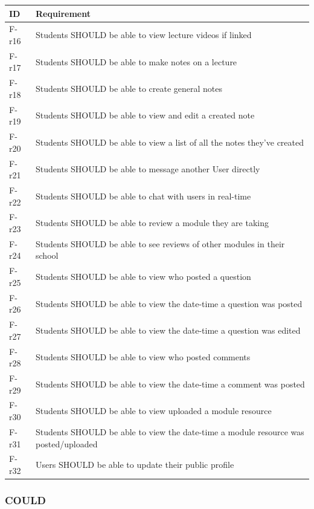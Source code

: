 \begin{tabular}{|p{1cm}|p{13cm}|}
    \hline
        \textbf{ID} & \textbf{Requirement} \\
    \hline
    F-r16 &
    Students SHOULD be able to view lecture videos if linked \\
    \hline
    F-r17 &
    Students SHOULD be able to make notes on a lecture \\
    \hline
    F-r18 &
    Students SHOULD be able to create general notes \\
    \hline
    F-r19 &
    Students SHOULD be able to view and edit a created note \\
    \hline
    F-r20 &
    Students SHOULD be able to view a list of all the notes they’ve created \\
    \hline
    F-r21 &
    Students SHOULD be able to message another User directly \\
    \hline
    F-r22 &
    Students SHOULD be able to chat with users in real-time \\
    \hline
    F-r23 &
    Students SHOULD be able to review a module they are taking \\
    \hline
    F-r24 &
    Students SHOULD be able to see reviews of other modules in their school \\
    \hline
    F-r25 &
    Students SHOULD be able to view who posted a question \\
    \hline
    F-r26 &
    Students SHOULD be able to view the date-time a question was posted \\
    \hline
    F-r27 &
    Students SHOULD be able to view the date-time a question was edited \\
    \hline
    F-r28 &
    Students SHOULD be able to view who posted comments \\
    \hline
    F-r29 &
    Students SHOULD be able to view the date-time a comment was posted \\
    \hline
    F-r30 &
    Students SHOULD be able to view uploaded a module resource \\
    \hline
    F-r31 &
    Students SHOULD be able to view the date-time a module resource was posted/uploaded \\
    \hline
    F-r32 &
    Users SHOULD be able to update their public profile \\
    \hline
\end{tabular}

\subsubsection{COULD}

